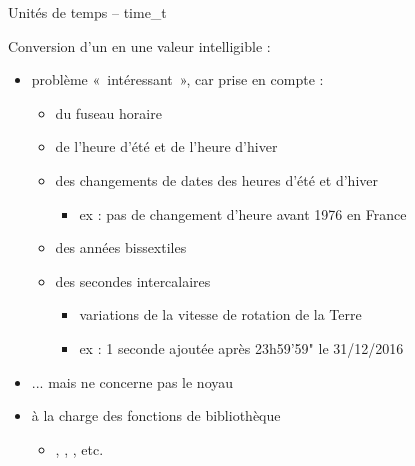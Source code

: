 \begin {frame} {Unités de temps -- time\_t}

    Conversion d'un  en une valeur intelligible :
    \begin {itemize}
	\item problème «~intéressant~», car prise en compte :
	    \begin {itemize}
		\item du fuseau horaire
		\item de l'heure d'été et de l'heure d'hiver
		\item des changements de dates des heures d'été et d'hiver
		    \begin {itemize}
			\item ex : pas de changement d'heure avant 1976
			    en France
		    \end {itemize}
		\item des années bissextiles
		\item des secondes intercalaires
		    \begin {itemize}
			\item variations de la vitesse de rotation de la Terre
			\item ex : 1 seconde ajoutée après 23h59'59"
			    le 31/12/2016
		    \end {itemize}
	    \end {itemize}

	\item ... mais ne concerne pas le noyau
	\item \implique à la charge des fonctions de bibliothèque
	    \begin {itemize}
		\item {}, , , etc.
	    \end {itemize}

    \end {itemize}
\end {frame}

